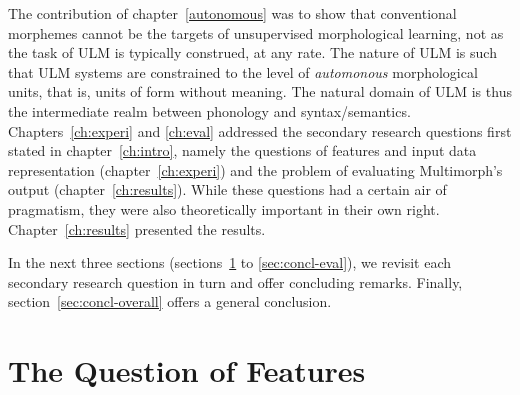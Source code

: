 The contribution of chapter~\ref{autonomous} was to show that conventional morphemes cannot be the targets of unsupervised morphological learning, not as the task of ULM is typically construed, at any rate. The nature of ULM is such that ULM systems are constrained to  %
the level of \emph{automonous} morphological units, that is, %
units of form without meaning. 
The natural domain of ULM is thus the intermediate realm between phonology and syntax/semantics. 
Chapters~\ref{ch:experi} and \ref{ch:eval} addressed the secondary research questions first stated in chapter~\ref{ch:intro}, namely the questions of features and input data representation (chapter~\ref{ch:experi}) and the problem of evaluating Multimorph's output (chapter~\ref{ch:results}). While these  questions had a certain air
of pragmatism, %
they were also theoretically important in their own right.
Chapter~\ref{ch:results} presented the results. %


In the next three sections (sections~\ref{sec:concl-features} to \ref{sec:concl-eval}), we revisit each secondary research question in turn and offer concluding remarks. Finally, section~\ref{sec:concl-overall} offers a general conclusion. 

\section{The Question of Features}\label{sec:concl-features}

